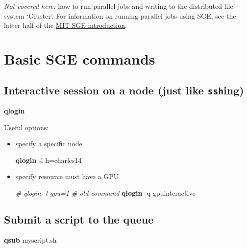 \documentclass[]{article}
\newenvironment{Shaded}{\begin{snugshade}}{\end{snugshade}}
\newcommand{\KeywordTok}[1]{\textcolor[rgb]{0.13,0.29,0.53}{\textbf{{#1}}}}
\newcommand{\CommentTok}[1]{\textcolor[rgb]{0.56,0.35,0.01}{\textit{{#1}}}}
\newcommand{\NormalTok}[1]{{#1}}
\begin{document}
\emph{Not covered here:} how to run parallel jobs and writing to the
distributed file system `Gluster'. For information on running parallel
jobs using SGE, see the latter half of the
\href{http://star.mit.edu/cluster/docs/0.92rc2/guides/sge.html}{MIT SGE
introduction}.

\section{Basic SGE commands}\label{basic-sge-commands}

\subsection{Interactive session on a node (just like
\texttt{ssh}ing)}\label{interactive-session-on-a-node-just-like-sshing}

\begin{Shaded}
\begin{Highlighting}[]
\KeywordTok{qlogin}
\end{Highlighting}
\end{Shaded}

Useful options:

\begin{itemize}
\item
  specify a specific node

\begin{Shaded}
\begin{Highlighting}[]
\KeywordTok{qlogin} \NormalTok{-l h=charles14}
\end{Highlighting}
\end{Shaded}
\item
  specify resource must have a GPU

\begin{Shaded}
\begin{Highlighting}[]
\CommentTok{# qlogin -l gpu=1  # old command}
\KeywordTok{qlogin} \NormalTok{-q gpuinteractive}
\end{Highlighting}
\end{Shaded}
\end{itemize}

\subsection{Submit a script to the
queue}\label{submit-a-script-to-the-queue}

\begin{Shaded}
\begin{Highlighting}[]
\KeywordTok{qsub} \NormalTok{myscript.sh}
\end{Highlighting}
\end{Shaded}
\end{document}
